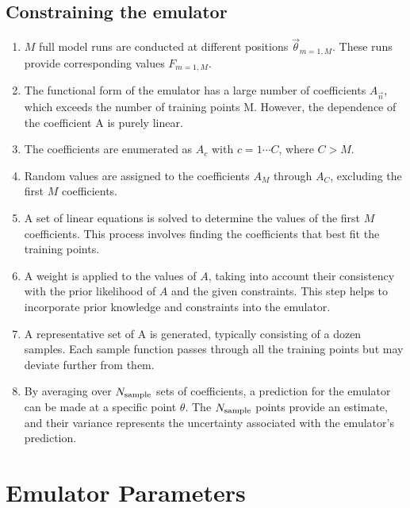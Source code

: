 \documentclass[12pt]{article}
\numberwithin{equation}{section}
\numberwithin{figure}{section}
\begin{document}
\subsection{Constraining the emulator}
\begin{enumerate}\itemsep=0pt
\item $M$ full model runs are conducted at different positions $\vec{\theta}_{m=1,M}$. These runs provide corresponding values $F_{m=1,M}$. 

\item The functional form of the emulator has a large number of coefficients $A_{\vec{n}}$, which exceeds the number of training points M. However, the dependence of the coefficient A is purely linear. 

\item The coefficients are enumerated as $A_c$ with $c=1\cdots C$, where $C>M$.

\item Random values are assigned to the coefficients $A_M$ through $A_C$, excluding the first $M$ coefficients. 

\item A set of linear equations is solved to determine the values of the first $M$ coefficients. This process involves finding the coefficients that best fit the training points. 

\item A weight is applied to the values of $A$, taking into account their consistency with the prior likelihood of $A$ and the given constraints. This step helps to incorporate prior knowledge and constraints into the emulator. 

\item A representative set of A is generated, typically consisting of a dozen samples. Each sample function passes through all the training points but may deviate further from them. 

\item By averaging over $N_{\rm sample}$ sets of coefficients, a prediction for the emulator can be made at a specific point $\theta$. The $N_{\rm sample}$ points provide an estimate, and their variance represents the uncertainty associated with the emulator's prediction. 

\end{enumerate}


\appendix


\section{Emulator Parameters}\label{sec:Emulator Parameter}
\end{document}
